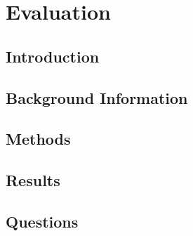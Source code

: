 






\maketitle %
\thispagestyle{fancy} %


\section{Evaluation} \label{sec:evaluation}


\subsection{Introduction} \label{sub:introduction}


\subsection{Background Information} \label{sub:background}


\subsection{Methods} \label{sub:methods}


\subsection{Results} \label{sub:results}


\subsection{Questions} \label{sub:questions1}


